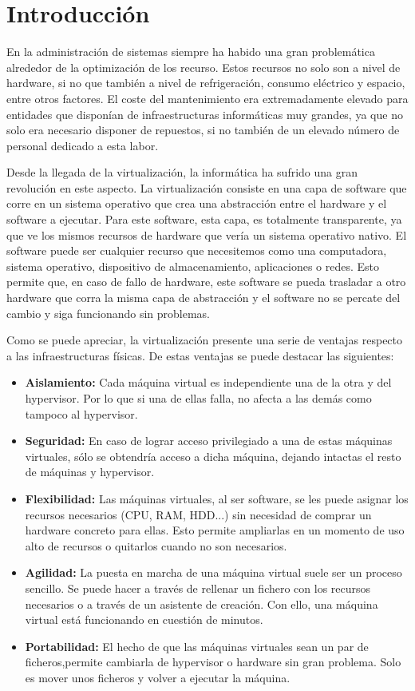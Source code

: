 \documentclass[12pt,a4paper,titlepage,twoside]{report}
\begin{document}
\chapter{Introducción}
En la administración de sistemas siempre ha habido una gran problemática alrededor de la optimización de los recurso. Estos recursos no solo son a nivel de hardware, si no que también a nivel de refrigeración, consumo eléctrico y espacio, entre otros factores. El coste del mantenimiento era extremadamente elevado para entidades que disponían de infraestructuras informáticas muy grandes, ya que no solo era necesario disponer de repuestos, si no también de un elevado número de personal dedicado a esta labor.
\par
Desde la llegada de la virtualización, la informática ha sufrido una gran revolución en este aspecto. La virtualización consiste en una capa de software que corre en un sistema operativo que crea una abstracción entre el hardware y el software a ejecutar. Para este software, esta capa, es totalmente transparente, ya que ve los mismos recursos de hardware que vería un sistema operativo nativo. El software puede ser cualquier recurso que necesitemos como una computadora, sistema operativo, dispositivo de almacenamiento, aplicaciones o redes. Esto permite que, en caso de fallo de hardware, este software se pueda trasladar a otro hardware que corra la misma capa de abstracción y el software no se percate del cambio y siga funcionando sin problemas. 
\par
Como se puede apreciar, la virtualización presente una serie de ventajas respecto a las infraestructuras físicas. De estas ventajas se puede destacar las siguientes:
\begin{itemize}
\item \textbf{Aislamiento:} Cada máquina virtual es independiente una de la otra y del hypervisor. Por lo que si una de ellas falla, no afecta a las demás como tampoco al hypervisor.
\item \textbf{Seguridad:} En caso de lograr acceso privilegiado a una de estas máquinas virtuales, sólo se obtendría acceso a dicha máquina, dejando intactas el resto de máquinas y  hypervisor.
\item \textbf{Flexibilidad:} Las máquinas virtuales, al ser software, se les puede asignar los recursos necesarios (CPU, RAM, HDD...) sin necesidad de comprar un hardware concreto para ellas. Esto permite ampliarlas en un momento de uso alto de recursos o quitarlos cuando no son necesarios.
\item \textbf{Agilidad:} La puesta en marcha de una máquina virtual suele ser un proceso sencillo. Se puede hacer a través de rellenar un fichero con los recursos necesarios o a través de un asistente de creación. Con ello, una máquina virtual está funcionando en cuestión de minutos.
\item \textbf{Portabilidad:} El hecho de que las máquinas virtuales sean un par de ficheros,permite cambiarla de hypervisor o hardware sin gran problema. Solo es mover unos ficheros y volver a ejecutar la máquina.
\end{itemize}
\end{document}
